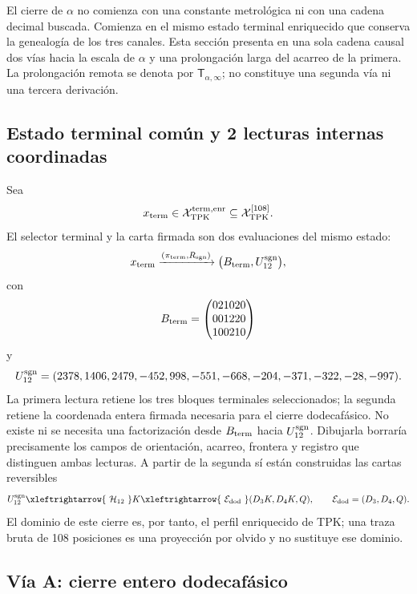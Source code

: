 
\label{sec:alpha-dos-vias-t1-rev8}

El cierre de \(\alpha\) no comienza con una constante metrológica ni con una
cadena decimal buscada. Comienza en el mismo estado terminal enriquecido que
conserva la genealogía de los tres canales. Esta sección presenta en una sola
cadena causal dos vías hacia la escala de \(\alpha\) y una prolongación larga
del acarreo de la primera. La prolongación remota se denota por
\(\mathsf T_{\alpha,\infty}\); no constituye una segunda vía ni una tercera
derivación.

\subsection{Estado terminal común y 2 lecturas internas coordinadas}

Sea
\[
 x_{\rm term}\in\mathcal X_{\rm TPK}^{\rm term,enr}
 \subseteq\mathcal X_{\rm TPK}^{[108]}.
\]
El selector terminal y la carta firmada son dos evaluaciones del mismo estado:
\begin{equation}
 x_{\rm term}
 \xrightarrow{(\pi_{\rm term},R_{\rm sgn})}
 \bigl(B_{\rm term},U_{12}^{\rm sgn}\bigr),
 \label{eq:alpha-rev8-doble-lectura-terminal}
\end{equation}
con
\[
 B_{\rm term}=
 \begin{pmatrix}
 021020\\001220\\100210
 \end{pmatrix}
\]
y
\[
 U_{12}^{\rm sgn}
 =(2378,1406,2479,-452,998,-551,-668,-204,-371,-322,-28,-997).
\]
La primera lectura retiene los tres bloques terminales seleccionados; la
segunda retiene la coordenada entera firmada necesaria para el cierre
dodecafásico. No existe ni se necesita una factorización desde
\(B_{\rm term}\) hacia \(U_{12}^{\rm sgn}\). Dibujarla borraría precisamente los
campos de orientación, acarreo, frontera y registro que distinguen ambas
lecturas. A partir de la segunda sí están construidas las cartas reversibles
\[
 U_{12}^{\rm sgn}
 \xleftrightarrow{\ \mathcal H_{12}\ }K
 \xleftrightarrow{\ \mathcal E_{\rm dod}\ }
 (D_3K,D_4K,Q),
 \qquad
 \mathcal E_{\rm dod}=(D_3,D_4,Q).
\]
El dominio de este cierre es, por tanto, el perfil enriquecido de TPK; una
traza bruta de 108 posiciones es una proyección por olvido y no sustituye ese
dominio.

\subsection{Vía A: cierre entero dodecafásico}

